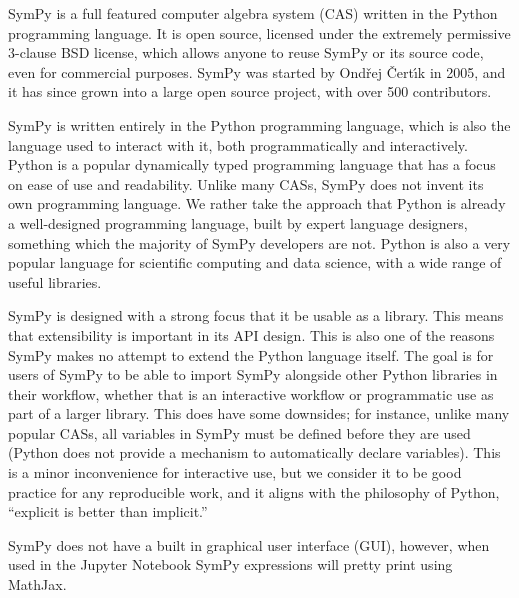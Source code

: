 SymPy is a full featured computer algebra system (CAS) written in the Python
programming language. It is open source, licensed under the extremely
permissive 3-clause BSD license, which allows anyone to reuse SymPy or its source code,
even for commercial purposes. SymPy was started by Ond\v{r}ej \v{C}ert\'{\i}k
in 2005, and it has since grown into a large open source project, with over
500 contributors.

SymPy is written entirely in the Python programming language,
which is also the language used to interact with it, both programmatically and
interactively. Python is a popular dynamically typed programming language that
has a focus on ease of use and readability. Unlike many CASs, SymPy does not
invent its own programming language. We rather take the approach that Python
is already a well-designed programming language, built by expert language
designers, something which the majority of SymPy developers are not. Python is
also a very popular language for scientific computing and data science, with a
wide range of useful libraries.

SymPy is designed with a strong focus that it be usable as a library. This
means that extensibility is important in its API design. This is also one of
the reasons SymPy makes no attempt to extend the Python language itself. The
goal is for users of SymPy to be able to import SymPy alongside other Python
libraries in their workflow, whether that is an interactive workflow or
programmatic use as part of a larger library. This does have some downsides;
for instance, unlike many popular CASs, all variables in SymPy must be defined
before they are used (Python does not provide a mechanism to automatically
declare variables). This is a minor inconvenience for interactive use, but we
consider it to be good practice for any reproducible work, and it aligns with
the philosophy of Python, ``explicit is better than implicit.''

SymPy does not have a built in graphical user interface (GUI), however, when
used in the Jupyter Notebook
SymPy expressions will pretty print using MathJax.
